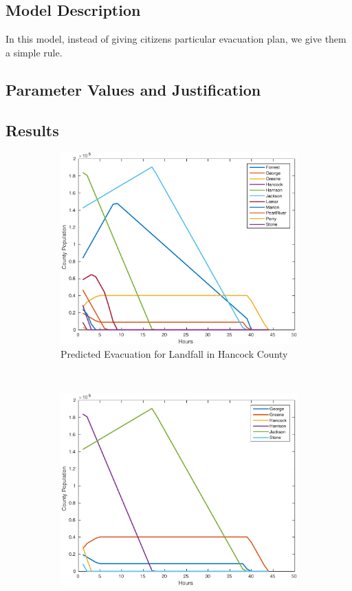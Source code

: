 \documentclass[titlepage]{article}
\begin{document}
  \subsection{Model Description}
    In this model, instead of giving citizens particular evacuation plan, we give them a simple rule.
  \subsection{Parameter Values and Justification}
  \subsection{Results}
  \begin{figure}
    \center
    \begin{subfigure}[b]{0.5\textwidth}
      \center
      \includegraphics[width=\linewidth]{figures/pred_hancock-crop.pdf}
      \caption{Predicted Evacuation for Landfall in Hancock County}
    \end{subfigure}~
    \begin{subfigure}[b]{0.5\textwidth}
      \center
      \includegraphics[width=\linewidth]{figures/pred_jackson-crop.pdf}

\end{subfigure}
\end{figure}
\end{document}
